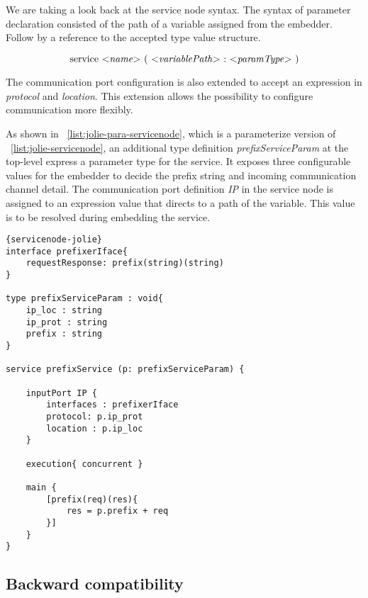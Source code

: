 We are taking a look back at the service node syntax. The syntax of parameter declaration consisted of the path of a variable assigned from the embedder. Follow by a reference to the accepted type value structure.

\[
    \text{service $<$\textit{name}$>$ $($ $<$\textit{variablePath}$>$ $:$ $<$\textit{paramType}$>$ $)$}
\]

The communication port configuration is also extended to accept an expression in \textit{protocol} and \textit{location}. This extension allows the possibility to configure communication more flexibly.

As shown in ~\ref{list:jolie-para-servicenode}, which is a parameterize version of ~\ref{list:jolie-servicenode}, an additional type definition \textit{prefixServiceParam} at the top-level express a parameter type for the service. It exposes three configurable values for the embedder to decide the prefix string and incoming communication channel detail. The communication port definition \textit{IP} in the service node is assigned to an expression value that directs to a path of the variable. This value is to be resolved during embedding the service.

\begin{listing}[h]

    \lstset{language=Jolie,
        style=codeStyle,
        numbers=left,
        firstnumber=1
    }
    \begin{lstlisting}[frame=tlrb, caption= {Jolie Parameterize Service Node Example}, label={list:jolie-para-servicenode} ]{servicenode-jolie}
interface prefixerIface{
    requestResponse: prefix(string)(string)
}

type prefixServiceParam : void{
    ip_loc : string
    ip_prot : string
    prefix : string
}

service prefixService (p: prefixServiceParam) {
    
    inputPort IP {
        interfaces : prefixerIface
        protocol: p.ip_prot
        location : p.ip_loc
    }

    execution{ concurrent }

    main {
        [prefix(req)(res){
            res = p.prefix + req
        }]
    }
}
    \end{lstlisting}
\end{listing}

\subsection{Backward compatibility}

